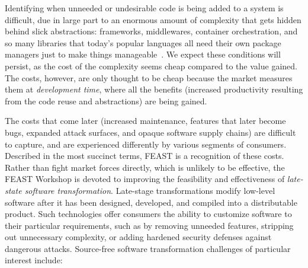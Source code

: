 \documentclass[sigconf]{acmart}
\begin{document}
Identifying when unneeded or undesirable code is being added to a system is
difficult, due in large part to an enormous amount of complexity that gets
hidden behind slick abstractions: frameworks, middlewares, container
orchestration, and so many libraries that today's popular languages all need
their own package managers just to make things manageable~\cite{dusing2022}.  We
expect these conditions will persist, as the cost of the complexity seems cheap
compared to the value gained. The costs, however, are only thought to be cheap
because the market measures them at \emph{development time}, where all the
benefits (increased productivity resulting from the code reuse and abstractions)
are being gained.

The costs that come later (increased maintenance, features that later become
bugs, expanded attack surfaces, and opaque software supply chains) are difficult
to capture, and are experienced differently by various segments of consumers.
Described in the most succinct terms, FEAST is a recognition of these costs.  
Rather than fight market forces directly, which is unlikely to be effective, the
FEAST Workshop is devoted to improving the feasibility and effectiveness of
\emph{late-state software transformation}. Late-stage transformations modify
low-level software after it has been designed, developed, and compiled into a
distributable product. Such technologies offer consumers the ability to
customize software to their particular requirements, such as by removing
unneeded features, stripping out unnecessary complexity, or adding hardened
security defenses against dangerous attacks. Source-free software transformation
challenges of particular interest include:
\end{document}
